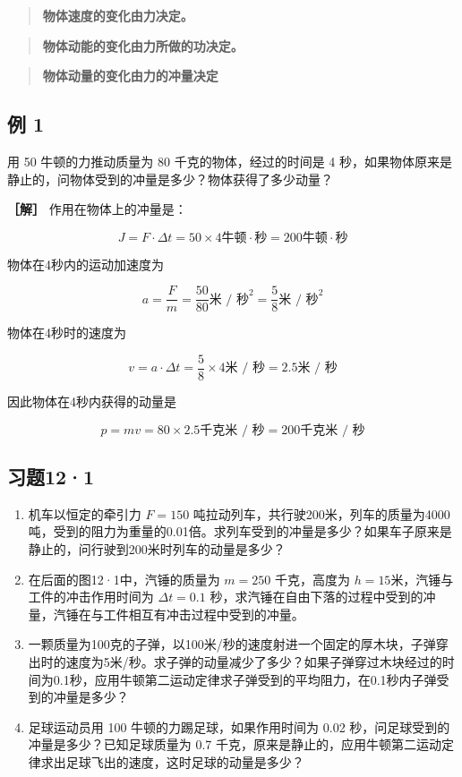 \begin{quote}
\textbf{物体速度的变化由力决定。}
\end{quote}

\begin{quote}
\textbf{物体动能的变化由力所做的功决定。}
\end{quote}

\begin{quote}
\textbf{物体动量的变化由力的冲量决定}
\end{quote}

\subsection{例 1}\label{ux4f8b-1-12}

用 50 牛顿的力推动质量为 80 千克的物体，经过的时间是 4
秒，如果物体原来是静止的，问物体受到的冲量是多少？物体获得了多少动量？

\textbf{［解］} 作用在物体上的冲量是：

\[
J = F \cdot \Delta t = 50 \times 4 \text{牛顿} \cdot \text{秒} = 200 \text{牛顿} \cdot \text{秒}
\]

物体在4秒内的运动加速度为

\[
a = \frac {F}{m} = \frac {50}{80} \text{米 / 秒} ^ {2} = \frac {5}{8} \text{米 / 秒} ^ {2}
\]

物体在4秒时的速度为

\[
v = a \cdot \Delta t = \frac {5}{8} \times 4 \text{米 / 秒} = 2.5 \text{米 / 秒}
\]

因此物体在4秒内获得的动量是

\[
p = m v = 80 \times 2.5 \text{千克米 / 秒} = 200 \text{千克米 / 秒}
\]

\subsection{习题12·1}\label{ux4e60ux9898121}

\begin{enumerate}
\def\labelenumi{\arabic{enumi}.}
\item
  机车以恒定的牵引力 \(F = 150\)
  吨拉动列车，共行驶200米，列车的质量为4000吨，受到的阻力为重量的0.01倍。求列车受到的冲量是多少？如果车子原来是静止的，问行驶到200米时列车的动量是多少？
\item
  在后面的图12·1中，汽锤的质量为 \(m = 250\) 千克，高度为
  \(h = 15\)米，汽锤与工件的冲击作用时间为 \(\Delta t = 0.1\)
  秒，求汽锤在自由下落的过程中受到的冲量，汽锤在与工件相互有冲击过程中受到的冲量。
\item
  一颗质量为100克的子弹，以100米/秒的速度射进一个固定的厚木块，子弹穿出时的速度为5米/秒。求子弹的动量减少了多少？如果子弹穿过木块经过的时间为0.1秒，应用牛顿第二运动定律求子弹受到的平均阻力，在0.1秒内子弹受到的冲量是多少？
\item
  足球运动员用 100 牛顿的力踢足球，如果作用时间为 0.02
  秒，问足球受到的冲量是多少？已知足球质量为 0.7
  千克，原来是静止的，应用牛顿第二运动定律求出足球飞出的速度，这时足球的动量是多少？
\end{enumerate}

